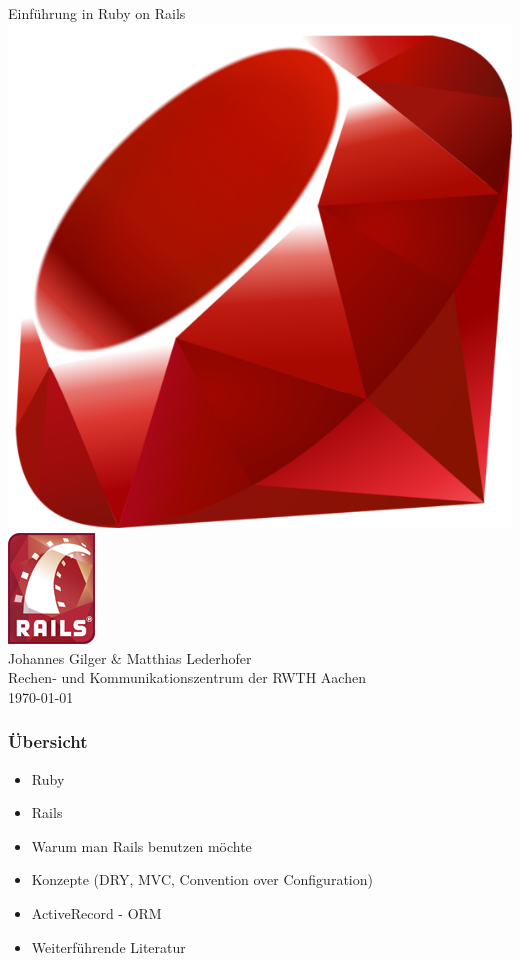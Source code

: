 \begin{frame}
  \begin{center}
    \vspace*{\fill}
    \Huge Einführung in Ruby on Rails \\
    \vspace{0.8cm}
    \includegraphics[scale=2]{img/ruby-logo.png} \enskip
    \includegraphics[scale=0.6]{img/rails-logo.png} \\
    \vspace{0.6cm}
    \Large Johannes Gilger \& Matthias Lederhofer \\
    \small Rechen- und Kommunikationszentrum der RWTH Aachen \\
    \vspace{1cm}
    \small \today
    \vspace*{\fill}
  \end{center}
\end{frame}

\begin{frame}
  \frametitle{Übersicht}
  \begin{itemize}
    \item Ruby
    \item Rails
    \item Warum man Rails benutzen möchte
    \item Konzepte (DRY, MVC, Convention over Configuration)
    \item ActiveRecord - ORM
    \item Weiterführende Literatur
  \end{itemize}
\end{frame}



